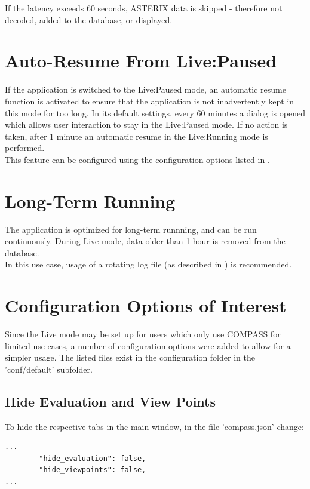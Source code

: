 If the latency exceeds 60 seconds, ASTERIX data is skipped - therefore not decoded, added to the database, or displayed.

\section{Auto-Resume From Live:Paused}

If the application is switched to the Live:Paused mode, an automatic resume function is activated to ensure that the application is not inadvertently kept in this mode for too long. In its default settings, every 60 minutes a dialog is opened which allows user interaction to stay in the Live:Paused mode. If no action is taken, after 1 minute an automatic resume in the Live:Running mode is performed. \\

This feature can be configured using the configuration options listed in .

\section{Long-Term Running}

The application is optimized for long-term runnning, and can be run continuously. During Live mode, data older than 1 hour is removed from the database. \\

In this use case, usage of a rotating log file (as described in ) is recommended.

\section{Configuration Options of Interest}

Since the Live mode may be set up for users which only use COMPASS for limited use cases, a number of configuration options were added to allow for a simpler usage. The listed files exist in the configuration folder in the 'conf/default' subfolder.

\subsection{Hide Evaluation and View Points}

To hide the respective tabs in the main window, in the file 'compass.json' change:

\begin{lstlisting}
...
        "hide_evaluation": false,
        "hide_viewpoints": false,
...        
\end{lstlisting}

